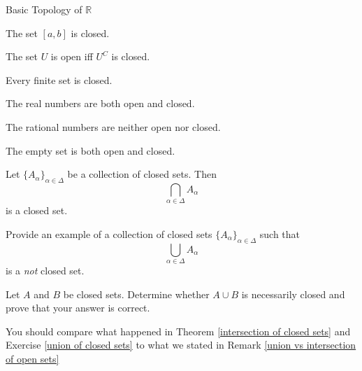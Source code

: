 \begin{section}{Basic Topology of $\mathbb{R}$}
\begin{exercise}
\end{exercise}

\begin{theorem}[*]
The set $[a,b]$ is closed.
\end{theorem}

\begin{theorem}
The set $U$ is open iff $U^C$ is closed.
\end{theorem}

\begin{theorem}[*]
Every finite set is closed.
\end{theorem}

\begin{theorem}
The real numbers are both open and closed.
\end{theorem}

\begin{theorem}
The rational numbers are neither open nor closed.
\end{theorem}

\begin{theorem}
The empty set is both open and closed.
\end{theorem}

\begin{theorem}[*]\label{intersection of closed sets}
Let $\{A_{\alpha}\}_{\alpha\in\Delta}$ be a collection of closed sets.  Then
\[
\bigcap_{\alpha\in \Delta} A_{\alpha}
\]
is a closed set.
\end{theorem}

\begin{exercise}\label{union of closed sets}
Provide an example of a collection of closed sets $\{A_{\alpha}\}_{\alpha\in\Delta}$ such that 
\[
\bigcup_{\alpha\in \Delta} A_{\alpha}
\]
is a \emph{not} closed set.
\end{exercise}

\begin{problem}
Let $A$ and $B$ be closed sets.  Determine whether $A\cup B$ is necessarily closed and prove that your answer is correct.
\end{problem}

\begin{remark}
You should compare what happened in Theorem \ref{intersection of closed sets} and Exercise \ref{union of closed sets} to what we stated in Remark \ref{union vs intersection of open sets}
\end{remark}

\end{section}
